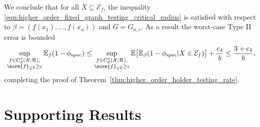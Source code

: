 \documentclass{article}
\newcommand{\1}{\mathbf{1}}
\newcommand{\Leb}{\mathcal{L}}
\newcommand{\spec}{\mathrm{spec}}
\theoremstyle{alden}
\theoremstyle{aldenthm}
\theoremstyle{definition}
\theoremstyle{remark}
\begin{document}
We conclude that for all $X \subseteq \mathcal{E}_f$, the inequality \eqref{eqn:higher_order_fixed_graph_testing_critical_radius} is satisfied with respect to $\beta = (f(x_1),\ldots,f(x_n))$ and $G = G_{n,r}$. As a result the worst-case Type II error is bounded
\begin{equation*}
\sup_{\substack{f \in C_d^{s}(\mathcal{X;R}), \\ \norm{f}_{\Leb^2} \geq \epsilon}}\mathbb{E}_{f}(1 - \phi_{\spec}) \leq \sup_{\substack{f \in C_d^{s}(\mathcal{X;R}), \\ \norm{f}_{\Leb^2} \geq \epsilon}} \mathbb{E}\bigl[\mathbb{E}_{\beta}(1 - \phi_{\spec}|X \in \mathcal{E}_f)\bigr] + \frac{c_4}{b} \leq \frac{3 + c_4}{b},
\end{equation*}
completing the proof of Theorem~\ref{thm:higher_order_holder_testing_rate}.

\section{Supporting Results}
\end{document}
